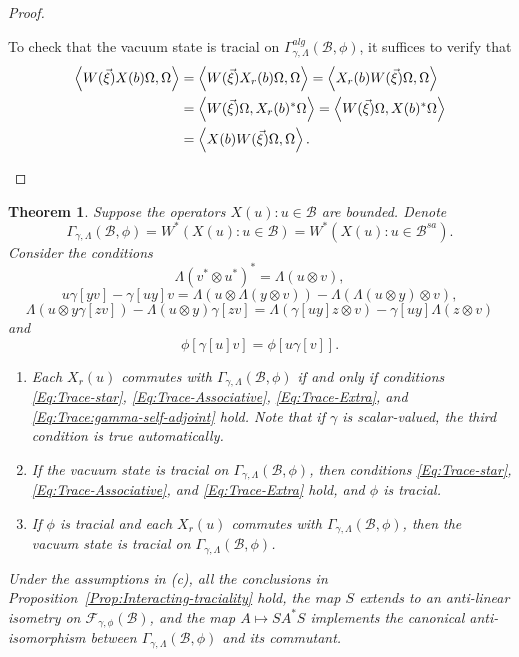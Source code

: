 \documentclass[12pt]{amsart}
\newtheorem{Thm}{Theorem}
\theoremstyle{definition}
\newcommand{\mc}[1]{\mathcal{#1}}
\newcommand{\ip}[2]{\left \langle{#1},{#2} \right \rangle}
\newcommand{\br}{\medskip\noindent}
\begin{document}
\begin{proof}
\begin{enumerate}
\br
To check that the vacuum state is tracial on $\Gamma^{alg}_{\gamma, \Lambda}(\mc{B}, \phi)$, it suffices to verify that
\[
\begin{split}
\ip{W(\vec{\xi}) X(b) \Omega}{\Omega}
& = \ip{W(\vec{\xi}) X_r(b) \Omega}{\Omega}
= \ip{X_r(b) W(\vec{\xi}) \Omega}{\Omega} \\
& = \ip{W(\vec{\xi}) \Omega}{X_r(b)^\ast \Omega}
= \ip{W(\vec{\xi}) \Omega}{X(b)^\ast \Omega} \\
& = \ip{X(b) W(\vec{\xi}) \Omega}{\Omega}. \qedhere
\end{split}
\]
\end{enumerate}
\end{proof}


\begin{Thm}\label{Thm:Traciality}
Suppose the operators $X(u) : u \in \mc{B}$ are bounded. Denote
\[
\Gamma_{\gamma, \Lambda}(\mc{B}, \phi) = W^\ast(X(u) : u \in \mc{B}) = W^\ast(X(u) : u \in \mc{B}^{sa}).
\]
Consider the conditions
\begin{equation}
\label{Eq:Trace-star}
\Lambda(v^\ast \otimes u^\ast)^\ast = \Lambda(u \otimes v),
\end{equation}
\begin{equation}
\label{Eq:Trace-Associative}
u \gamma[y v] - \gamma[u y] v = \Lambda(u \otimes \Lambda(y \otimes v)) - \Lambda(\Lambda(u \otimes y) \otimes v),
\end{equation}
\begin{equation}
\label{Eq:Trace-Extra}
\Lambda(u \otimes y \gamma[z v]) - \Lambda(u \otimes y) \gamma[z v] = \Lambda(\gamma[u y] z \otimes v) - \gamma[u y] \Lambda(z \otimes v)
\end{equation}
and
\begin{equation}
\label{Eq:Trace:gamma-self-adjoint}
\phi[\gamma[u] v] = \phi[u \gamma[v]].
\end{equation}
\begin{enumerate}
\item
Each $X_r(u)$ commutes with $\Gamma_{\gamma, \Lambda}(\mc{B}, \phi)$ if and only if conditions \eqref{Eq:Trace-star}, \eqref{Eq:Trace-Associative}, \eqref{Eq:Trace-Extra}, and \eqref{Eq:Trace:gamma-self-adjoint} hold. Note that if $\gamma$ is scalar-valued, the third condition is true automatically.
\item
If the vacuum state is tracial on $\Gamma_{\gamma, \Lambda}(\mc{B}, \phi)$, then conditions \eqref{Eq:Trace-star}, \eqref{Eq:Trace-Associative}, and \eqref{Eq:Trace-Extra} hold, and $\phi$ is tracial.
\item
If $\phi$ is tracial and each $X_r(u)$ commutes with $\Gamma_{\gamma, \Lambda}(\mc{B}, \phi)$, then the vacuum state is tracial on $\Gamma_{\gamma, \Lambda}(\mc{B}, \phi)$.
\end{enumerate}
Under the assumptions in (c), all the conclusions in Proposition~\ref{Prop:Interacting-traciality} hold, the map $S$ extends to an anti-linear isometry on $\mc{F}_{\gamma, \phi}(\mc{B})$, and the map $A \mapsto S A^\ast S$ implements the canonical anti-isomorphism between $\Gamma_{\gamma, \Lambda}(\mc{B}, \phi)$ and its commutant.
\end{Thm}
\end{document}
